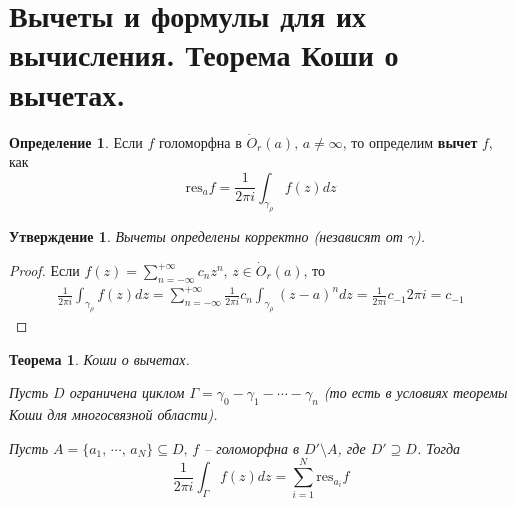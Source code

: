 \documentclass[a4paper,12pt]{article}
\theoremstyle{plain}
\newtheorem{theorem}{Теорема}[section]
\newtheorem{proposition}{Утверждение}[section]
\theoremstyle{definition}
\newtheorem{definition}{Определение}[section]
\theoremstyle{remark}
\begin{document}
\section{Вычеты и формулы для их вычисления. Теорема Коши о вычетах.}
\begin{definition}
	Если $f$ голоморфна в $\dot{O}_r(a),\, a \neq \infty$, то определим \textbf{вычет} $f$, как
	\[
		\text{res}_af = \frac{1}{2\pi i}\int_{\gamma_\rho}f(z)dz
	\]
\end{definition}

\begin{proposition}
	Вычеты определены корректно (независят от $\gamma$).
\end{proposition}

\begin{proof}
	Если $f(z) = \sum_{n = -\infty}^{+\infty} c_nz^n,\, z \in \dot{O}_r(a)$, то
	\begin{align*}
		\frac{1}{2\pi i}\int_{\gamma_\rho}f(z)dz = \sum_{n = -\infty}^{+\infty}\frac{1}{2\pi i}c_n\int_{\gamma_\rho}(z - a)^ndz = \frac{1}{2\pi i}c_{-1}2\pi i = c_{-1}
	\end{align*}
\end{proof}

\begin{theorem}
	Коши о вычетах.

	Пусть $D$ ограничена циклом $\Gamma = \gamma_0 - \gamma_1 - \cdots - \gamma_n$ (то есть в условиях теоремы Коши для многосвязной области).

	Пусть $A = \{a_1,\,\cdots,\, a_N\} \subseteq D,\, f$ -- голоморфна в $D' \setminus A$, где $D' \supseteq D$. Тогда
	\[
		\frac{1}{2\pi i}\int_\Gamma f(z)dz = \sum_{i = 1}^N \text{res}_{a_i} f
	\]
\end{theorem}
\end{document}
